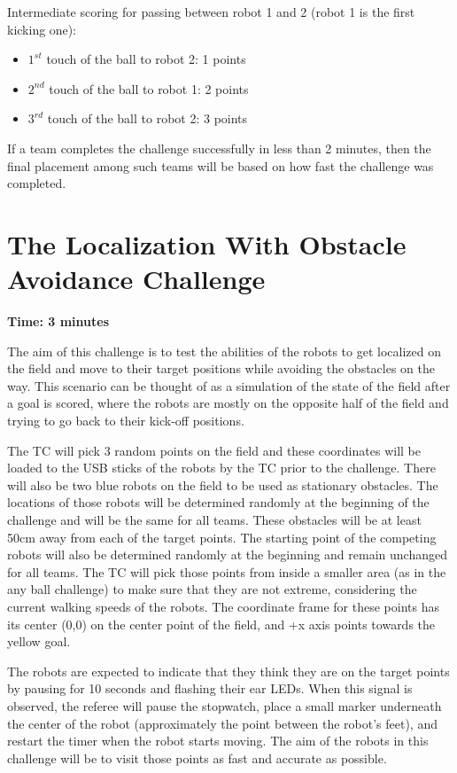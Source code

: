 \documentclass{article}
\begin{document}
Intermediate scoring for passing between robot 1 and 2 (robot 1 is the first kicking one):
\begin{itemize}
 \item $1^{st}$ touch of the ball to robot 2:  1 points
 \item $2^{nd}$ touch of the ball to robot 1:  2 points
 \item $3^{rd}$ touch of the ball to robot 2:  3 points
\end{itemize}

If a team completes the challenge successfully in less than 2 minutes, then the final placement among such teams will be based on how fast the challenge was completed.

\newpage
\section{The Localization With Obstacle Avoidance Challenge}
\label{sec:localization}

\textbf{Time: 3 minutes}

The aim of this challenge is to test the abilities of the robots to get localized on the field and move to their target positions while avoiding the obstacles on the way. This scenario can be thought of as a simulation of the state of the field after a goal is scored, where the robots are mostly on the opposite half of the field and trying to go back to their kick-off positions. 

The TC will pick 3 random points on the field and these coordinates will be loaded to the USB sticks of the robots by the TC prior to the challenge. There will also be two blue robots on the field to be used as stationary obstacles. The locations of those robots will be determined randomly at the beginning of the challenge and will be the same for all teams. These obstacles will be at least 50cm away from each of the target points. The starting point of the competing robots will also be determined randomly at the beginning and remain unchanged for all teams. The TC will pick those points from inside a smaller area (as in the any ball challenge) to make sure that they are not extreme, considering the current walking speeds of the robots. The coordinate frame for these points has its center (0,0) on the center point of the field, and +x axis points towards the yellow goal. 

The robots are expected to indicate that they think they are on the target points by pausing for 10 seconds and flashing their ear LEDs. When this signal is observed, the referee will pause the stopwatch, place a small marker underneath the center of the robot (approximately the point between the robot's feet), and restart the timer when the robot starts moving. The aim of the robots in this challenge will be to visit those points as fast and accurate as possible.
\end{document}
